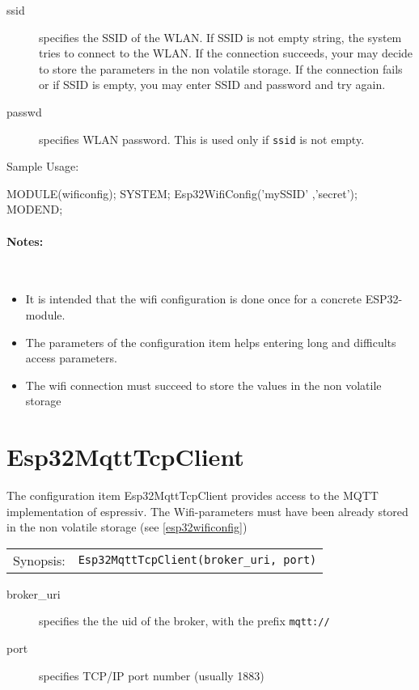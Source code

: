 \begin{description}
\item [ssid] specifies the SSID of the WLAN. If SSID is not empty string, 
   the system tries to connect to the WLAN. If the connection succeeds, 
   your may decide to store the parameters in the non volatile storage.
   If the connection fails or if SSID is empty, you may enter SSID and password
   and try again.
\item[passwd] specifies WLAN password. 
     This is used only if \texttt{ssid} is not empty.
\end{description}


Sample Usage:
\begin{PEARLCode}
MODULE(wificonfig);
SYSTEM;
   Esp32WifiConfig('mySSID' ,'secret');
MODEND;
\end{PEARLCode}

\paragraph{Notes:}\ \\
\begin{itemize}
\item It is intended that the wifi configuration is done once for
  a concrete ESP32-module.
\item The parameters of the configuration item helps entering 
  long and difficults access parameters.
\item The wifi connection must succeed to store the values in the non
  volatile storage
\end{itemize}


\section{Esp32MqttTcpClient}
The configuration item Esp32MqttTcpClient provides access to the MQTT implementation of 
espressiv.
The Wifi-parameters must have been already stored in the non volatile storage (see \ref{esp32wificonfig})

\begin{tabular}{ll}
Synopsis: & \verb|Esp32MqttTcpClient(broker_uri, port)| \\
\end{tabular}

\begin{description}
\item [broker\_uri] specifies the the uid of the broker, 
	with the prefix \texttt{mqtt://}
\item[port] specifies  TCP/IP port number (usually  1883)
\end{description}

